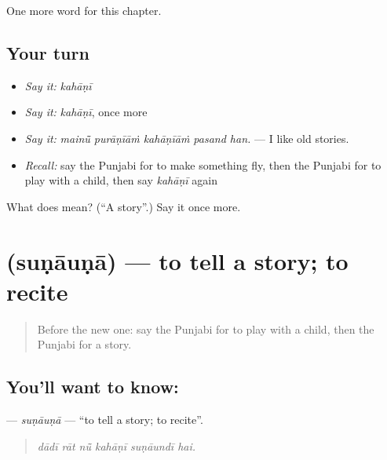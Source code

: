 \begin{grammarlens}[title={What you've built}]
One more word for this chapter.
\end{grammarlens}

\subsection*{Your turn}
\begin{itemize}
\raggedright
  \item \emph{Say it:} \emph{kahāṇī}
  \item \emph{Say it:} \emph{kahāṇī}, once more
  \item \emph{Say it:} \emph{mainū̃ purāṇīāṁ kahāṇīāṁ pasand han.} — I like old stories.
  \item \emph{Recall:} say the Punjabi for to make something fly, then the Punjabi for to play with a child, then say \emph{kahāṇī} again
\end{itemize}

\begin{tcolorbox}[breakable,colback=teal!4,colframe=teal!35!black,title={Before you move on}]
What does  mean? (\textquotedblleft{}A story\textquotedblright{}.) Say it once more.
\end{tcolorbox}
\section[\texorpdfstring{\pa{ਸੁਣਾਉਣਾ} (suṇāuṇā)}{ਸੁਣਾਉਣਾ (suṇāuṇā)}]{ (suṇāuṇā) — to tell a story; to recite}

\label{lesson:PA-C354-sunauna}



\begin{quote}
Before the new one: say the Punjabi for to play with a child, then the Punjabi for a story.
\end{quote}

\subsection*{You'll want to know: }
\textbf{} — \emph{suṇāuṇā} — \textquotedblleft{}to tell a story; to recite\textquotedblright{}.

\begin{quote}
     
\end{quote}

\begin{quote}
\emph{dādī rāt nū̃ kahāṇī suṇāundī hai.}
\end{quote}

